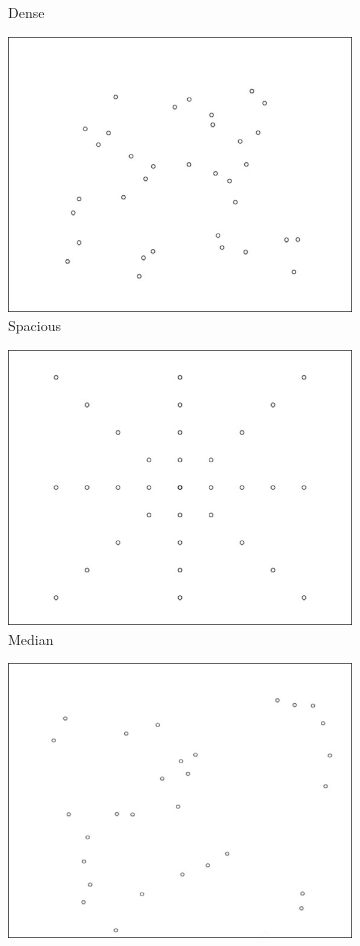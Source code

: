 \documentclass[runningheads]{llncs}
\begin{document}
\begin{figure}[H]
\begin{subfigure}{0.3\textwidth}
		\caption{Dense}
		\label{fig:3}
	\end{subfigure}
	\medskip
	\begin{subfigure}{0.3\textwidth}
		\includegraphics[width=.8\linewidth]{spacious.png}\quad
		\caption{Spacious}
		\label{fig:4}
	\end{subfigure}\hfil
	\begin{subfigure}{0.3\textwidth}
		\centering
		\includegraphics[width=.8\linewidth]{median.png}\quad
		\caption{Median}
		\label{fig:5}
	\end{subfigure}\hfil
	\begin{subfigure}{0.3\textwidth}
		\centering
		\includegraphics[width=.8\linewidth]{optimal.png}

\end{subfigure}
\end{figure}
\end{document}
